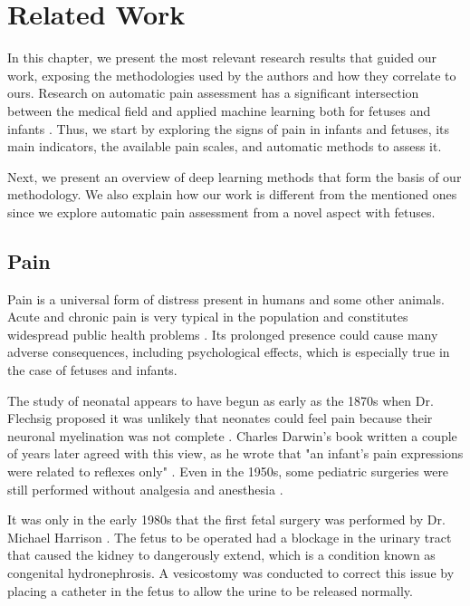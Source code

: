 \chapter{Related Work}

In this chapter, we present the most relevant research results that guided our work, exposing the methodologies used by the authors and how they correlate to ours. Research on automatic pain assessment has a significant intersection between the medical field and applied machine learning both for fetuses and infants \citep{ZamzmiPGKSA16, Bellieni2012}. Thus, we start by exploring the signs of pain in infants and fetuses, its main indicators, the available pain scales, and automatic methods to assess it. 

Next, we present an overview of deep learning methods that form the basis of our methodology. We also explain how our work is different from the mentioned ones since we explore automatic pain assessment from a novel aspect with fetuses.

\section{Pain}

Pain is a universal form of distress present in humans and some other animals. Acute and chronic pain is very typical in the population and constitutes widespread public health problems \citep{Goldberg2011}. Its prolonged presence could cause many adverse consequences, including psychological effects, which is especially true in the case of fetuses and infants.

The study of neonatal appears to have begun as early as the 1870s when Dr. Flechsig proposed it was unlikely that neonates could feel pain because their neuronal myelination was not complete \citep{cope1998neonatal}. Charles Darwin's book written a couple of years later agreed with this view, as he wrote that "an infant's pain expressions were related to reflexes only" \citep{darwin1872expression}. Even in the 1950s, some pediatric surgeries were still performed without analgesia and anesthesia \citep{cope1998neonatal}.

It was only in the early 1980s that the first fetal surgery was performed by Dr. Michael Harrison \citep{Harrison1982}. The fetus to be operated had a blockage in the urinary tract that caused the kidney to dangerously extend, which is a condition known as congenital hydronephrosis. A vesicostomy was conducted to correct this issue by placing a catheter in the fetus to allow the urine to be released normally.

